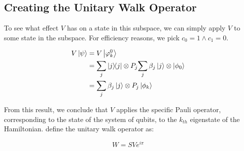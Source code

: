 \subsection{Creating the Unitary Walk Operator}


To see what effect $V$ has on a state in this subspace, we can simply apply $V$ to some state in the subspace. For efficiency reasons, we pick $c_0 = 1 \wedge c_1 = 0$.

\begin{align} \begin{split}
V \left\vert{\psi}\right\rangle &= V \left\vert{\varphi_k^0}\right\rangle\\
&= {\sum_{j}| j \rangle\!\langle j | \otimes P_{j}} {\sum_j\beta_j\left\vert{j }\right\rangle\otimes \left\vert{\phi_0}\right\rangle}\\
&= \sum_j \beta_j \left\vert{j}\right\rangle \otimes P_j \left\vert{\phi_k}\right\rangle
\end{split} \end{align}

From this result, we conclude that $V$ applies the specific Pauli operator, corresponding to the state of the system of qubits, to the $k_{th}$ eigenstate of the Hamiltonian. \textcite{poulin} define the unitary walk operator as:

$$
W = SVe^{i\pi}
$$

